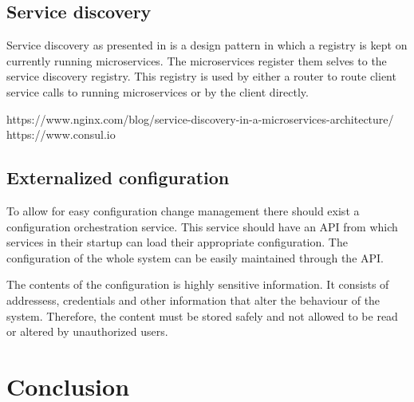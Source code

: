 \subsection{Service discovery}
\begin{sloppypar}
    Service discovery as presented in \citet{DBLP:journals/corr/MontesiW16} is a 
    design pattern in which a registry is kept on currently running microservices. 
    The microservices register them selves to the service discovery registry. 
    This registry is used by either a router to route client service calls to 
    running microservices or by the client directly.
\end{sloppypar}
\begin{sloppypar}
\end{sloppypar}
\begin{sloppypar}
    https://www.nginx.com/blog/service-discovery-in-a-microservices-architecture/
    https://www.consul.io
\end{sloppypar}


\subsection{Externalized configuration}
\begin{sloppypar}
    To allow for easy configuration change management there should exist a 
    configuration orchestration service. This service should have an API from 
    which services in their startup can load their appropriate configuration. 
    The configuration of the whole system can be easily maintained through the 
    API.
\end{sloppypar}
\begin{sloppypar}
    The contents of the configuration is highly sensitive information. It 
    consists of addressess, credentials and other information that alter 
    the behaviour of the system. Therefore, the content must be stored safely 
    and not allowed to be read or altered by unauthorized users.
\end{sloppypar}





\section{Conclusion}
\begin{sloppypar}

\end{sloppypar}


